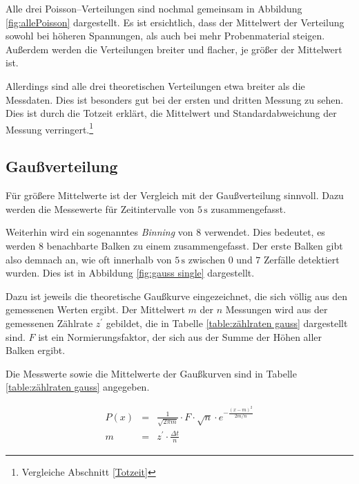 \documentclass[12pt,a4paper]{scrartcl}
\numberwithin{equation}{section} %
\begin{document}
Alle drei Poisson--Verteilungen sind nochmal gemeinsam in Abbildung \ref{fig:allePoisson} dargestellt. Es ist ersichtlich, dass der Mittelwert der Verteilung sowohl bei höheren Spannungen, als auch bei mehr Probenmaterial steigen. Außerdem werden die Verteilungen breiter und flacher, je größer der Mittelwert ist.

Allerdings sind alle drei theoretischen Verteilungen etwa breiter als die Messdaten. Dies ist besonders gut bei der ersten und dritten Messung zu sehen. Dies ist durch die Totzeit erklärt, die Mittelwert und Standardabweichung der Messung verringert.\footnote{Vergleiche Abschnitt \ref{Totzeit}}

\newpage
\hypertarget{gauuxdfverteilung}{%
\subsection{Gaußverteilung}\label{gauuxdfverteilung}}
Für größere Mittelwerte ist der Vergleich mit der Gaußverteilung sinnvoll. Dazu werden die Messewerte für Zeitintervalle von $5 \mathrm{\,s}$ zusammengefasst.

Weiterhin wird ein sogenanntes \textit{Binning} von $8$ verwendet. Dies bedeutet, es werden $8$ benachbarte Balken zu einem zusammengefasst. Der erste Balken gibt also demnach an, wie oft innerhalb von $5 \mathrm{\, s}$ zwischen $0$ und $7$ Zerfälle detektiert wurden. Dies ist in Abbildung \ref{fig:gauss single} dargestellt.

Dazu ist jeweils die theoretische Gaußkurve eingezeichnet, die sich völlig aus den gemessenen Werten ergibt. Der Mittelwert $m$ der $n$ Messungen wird aus der gemessenen Zählrate $z^\prime$ gebildet, die in Tabelle \ref{table:zählraten gauss} dargestellt sind. $F$ ist ein Normierungsfaktor, der sich aus der Summe der Höhen aller Balken ergibt.

Die Messwerte sowie die Mittelwerte der Gaußkurven sind in Tabelle \ref{table:zählraten gauss} angegeben.

\begin{eqnarray}
	P(x) &=& \frac{1}{\sqrt{2 \pi m}} \cdot F \cdot \sqrt{n} \cdot e^{- \frac{(x-m)^2}{2m/n}} \\
	m &=& z^\prime \cdot \frac{\Delta t}{n}
\end{eqnarray}
\end{document}
